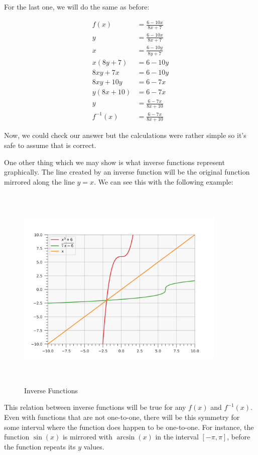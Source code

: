 \documentclass[12pt]{article}
\begin{document}
For the last one, we will do the same as before:

\begin{align}
    f(x)       & = \frac{6-10x}{8x+7}   \\
    y          & = \frac{6-10x}{8x+7}   \\
    x          & = \frac{6-10y}{8y+7}   \\
    x(8y+7)    & = 6-10y                \\
    8xy + 7x   & = 6-10y                \\
    8xy + 10y  & = 6-7x                 \\
    y(8x + 10) & = 6-7x                 \\
    y          & = \frac{6-7x}{8x + 10} \\
    f^{-1}(x)  & = \frac{6-7x}{8x + 10}
\end{align}

Now, we could check our answer but the calculations were rather simple so it's safe to assume that is correct.

One other thing which we may show is what inverse functions represent graphically.
The line created by an inverse function will be the original function mirrored along the line $y=x$.
We can see this with the following example:

\begin{figure}[H]
    \centering
    \includegraphics[width=10cm, height=10cm]{inverse_functions.png}
    \caption{Inverse Functions}
    \label{fig:fig1}
\end{figure}

This relation between inverse functions will be true for any $f(x)$ and $f^{-1}(x)$.
Even with functions that are not one-to-one, there will be this symmetry for some interval where the function does happen to be one-to-one.
For instance, the function $\sin(x)$ is mirrored with $\arcsin(x)$ in the interval $[-\pi, \pi]$, before the function repeats its $y$ values.
\end{document}
